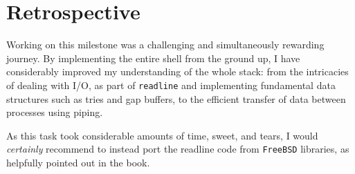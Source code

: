 \section{Retrospective}

Working on this milestone was a challenging and simultaneously rewarding journey. By implementing the entire shell from the ground up, I have considerably improved my understanding of the whole stack: from the intricacies of dealing with I/O, as part of \texttt{readline} and implementing fundamental data structures such as tries and gap buffers, to the efficient transfer of data between processes using piping.

As this task took considerable amounts of time, sweet, and tears, I would \emph{certainly} recommend to instead port the readline code from \texttt{FreeBSD} libraries, as helpfully pointed out in the book.